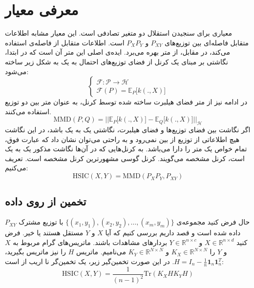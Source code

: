 \documentclass[a4paper]{article}
\begin{document}
	
	
	\section{معرفی معیار 
	}
	معیاری برای سنجیدن استقلال دو متغیر تصادفی است. این معیار مشابه اطلاعات متقابل فاصله‌ای بین توزیع‌های
	$P_{XY}$
	و 
	$P_XP_Y$
	است. اطلاعات متقابل از فاصله‌ی 
	استفاده می‌کند، در مقابل،
	از متر 
	بهره می‌برد. ایده‌ی اصلی این متر آن است که در ابتدا، نگاشتی بر مبنای یک کرنل از فضای توزیع‌های احتمال به یک 
	به شکل زیر ساخته می‌شود:
	$$
	\begin{cases}
	\mathcal{F}: \mathcal{P} \to \mathcal{H}\\
	\mathcal{F}(P) = \mathbb{E}_{P}\Big[ k(., X)\Big]
	\end{cases}
	$$
	در ادامه نیز از متر فضای هیلبرت ساخته شده توسط کرنل، به عنوان متر بین دو توزیع استفاده می‌کنند.
	$$\mathrm{MMD}(P, Q) = \Big|\Big|\mathbb{E}_{P}\Big[ k(., X)\Big] - \mathbb{E}_{Q}\Big[ k(., X)\Big]\Big|\Big|_\mathcal{H}$$
	اگر نگاشت بین فضای توزیع‌ها و فضای هیلبرت، نگاشتی یک به یک باشد، در این نگاشت هیچ اطلاعاتی از توزیع از بین نمی‌رود و به راحتی می‌توان نشان داد که عبارت فوق، تمام خواص یک متر را دارا می‌باشد. به کرنل‌هایی که در آن‌ها نگاشت مذکور یک به یک است، کرنل مشخصه می‌گویند. کرنل گوسی مشهور‌ترین کرنل مشخصه است. تعریف می‌کنیم:
	$$\mathrm{HSIC}(X, Y) = \mathrm{MMD}(P_XP_Y, P_{XY})$$
	\subsection{تخمین 
		از روی داده
	}
	حال فرض کنید مجموعه‌ی 
	$\{(x_1, y_1), (x_2, y_2), \dots, (x_m, y_m)\}$
	با توزیع مشترک
	$P_{XY}$
	داده شده است و قصد داریم بررسی کنیم که آیا $X$ و $Y$ مستقل هستند یا خیر. فرض کنید 
	$X \in \mathbb{R}^{n\times d}$
	و 
	$Y \in \mathbb{R}^{n\times c}$
	بردارهای مشاهدات باشند. ماتریس‌های گرام مربوط به $X$ و $Y$ را 
	$K_X \in \mathbb{R}^{N\times N}$
	و 
	$K_Y \in \mathbb{R}^{N\times N}$
	می‌نامیم. ماتریس $H$ را نیز ماتریس 
	بگیرید،
	$H = I_n - \frac{1}{n} \mathbf{1}_n\mathbf{1}_n^T$.
	در این صورت تخمین‌گیر زیر، یک تخمین‌گر نا اریب از 
	است:
	$$\mathrm{HSIC}(X, Y) = \frac{1}{(n-1)^2} \mathrm{Tr}(K_X H K_Y H)$$
\end{document}
